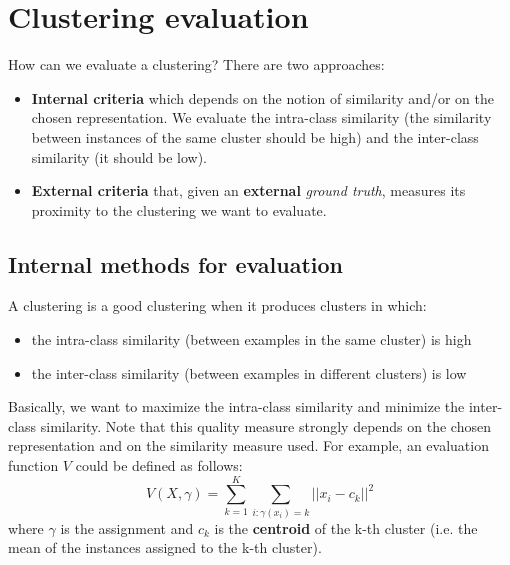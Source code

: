 \section{Clustering evaluation}
How can we evaluate a clustering? There are two approaches:
\begin{itemize}
    \item \textbf{Internal criteria} which depends on the notion of similarity and/or on the chosen representation. We evaluate the intra-class similarity (the similarity between instances of the same cluster should be high) and the inter-class similarity (it should be low).
    \item \textbf{External criteria} that, given an \textbf{external} \textit{ground truth}, measures its proximity to the clustering we want to evaluate. 
\end{itemize}
\subsection{Internal methods for evaluation}
A clustering is a good clustering when it produces clusters in which:
\begin{itemize}
    \item the intra-class similarity (between examples in the same cluster) is high
    \item the inter-class similarity (between examples in different clusters) is low
\end{itemize}
Basically, we want to maximize the intra-class similarity and minimize the inter-class similarity. Note that this quality measure strongly depends on the chosen representation and on the similarity measure used. For example, an evaluation function $V$ could be defined as follows:
\[V(X,\gamma) = \sum_{k=1}^{K}\sum_{i:\gamma (x_{i})=k} ||x_{i} - c_{k}||^{2}\]
where $\gamma$ is the assignment and $c_{k}$ is the \textbf{centroid} of the k-th cluster (i.e. the mean of the instances assigned to the k-th cluster).

